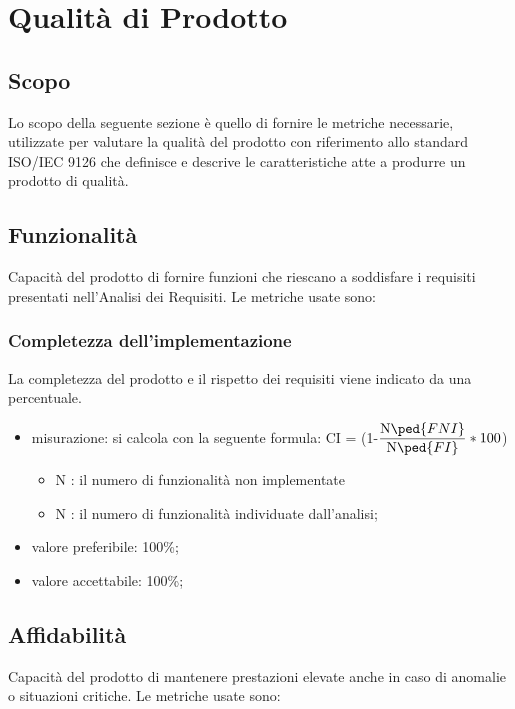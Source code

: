 \section{Qualità di Prodotto}

\subsection{Scopo}
Lo scopo della seguente sezione è quello di fornire le metriche necessarie, utilizzate per valutare la qualità del prodotto con riferimento allo standard ISO/IEC 9126 che definisce e descrive le caratteristiche atte a produrre un prodotto di qualità.

\subsection{Funzionalità}
Capacità del prodotto di fornire funzioni che riescano a soddisfare i requisiti presentati nell'Analisi dei Requisiti.
Le metriche usate sono:
	\subsubsection{Completezza dell'implementazione}
	La completezza del prodotto e il rispetto dei requisiti viene indicato da una percentuale.
	\begin{itemize}
	\item{misurazione: si calcola con la seguente formula: CI = (1-$\displaystyle\frac{\mbox{N}\ped{FNI}}{\mbox{N}\ped{FI}}*100$)
		\begin{itemize}
		\item{{N} : il numero di funzionalità non implementate}
		\item{{N} : il numero di funzionalità individuate dall'analisi;}
		\end{itemize}}
	\item {valore preferibile: 100\%;}
	\item {valore accettabile: 100\%;}
	\end{itemize}
	
\subsection{Affidabilità}
Capacità del prodotto di mantenere prestazioni elevate anche in caso di anomalie o situazioni critiche.
Le metriche usate sono:

